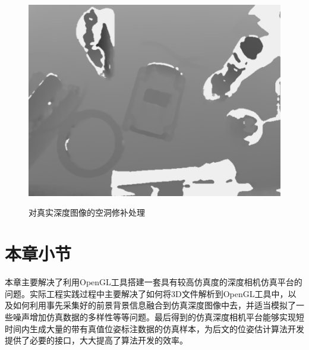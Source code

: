 \begin{figure}[htb]
{		\includegraphics[scale=0.7]{./mypic/空洞修补2.png} 
}
\caption{对真实深度图像的空洞修补处理}
\end{figure}


\section{本章小节}

本章主要解决了利用OpenGL工具搭建一套具有较高仿真度的深度相机仿真平台的问题。实际工程实践过程中主要解决了如何将3D文件解析到OpenGL工具中，以及如何利用事先采集好的前景背景信息融合到仿真深度图像中去，并适当模拟了一些噪声增加仿真数据的多样性等等问题。最后得到的仿真深度相机平台能够实现短时间内生成大量的带有真值位姿标注数据的仿真样本，为后文的位姿估计算法开发提供了必要的接口，大大提高了算法开发的效率。







